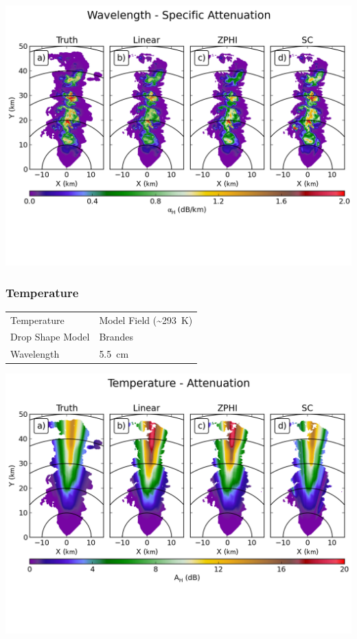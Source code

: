 \documentclass[red]{beamer}
\begin{document}
\begin{frame}
	\begin{center}
		\includegraphics[scale=0.55]{figures/C_Wavelength_Specific_Attenuation.png}
	\end{center}
\end{frame}

\begin{frame}
	\frametitle{Temperature}
	\begin{center}
	    \begin{tabular}{ | l | l | }
	        \hline
	        Temperature & Model Field (\textasciitilde\SI{293}{\kelvin}) \\
	        Drop Shape Model & Brandes \\
	        Wavelength & \SI{5.5}{\centi\meter} \\
			\hline
	    \end{tabular}
	\end{center}	
\end{frame}

\begin{frame}
	\begin{center}
		\includegraphics[scale=0.55]{figures/C_Temperature_Attenuation.png}
	\end{center}
\end{frame}
\end{document}
